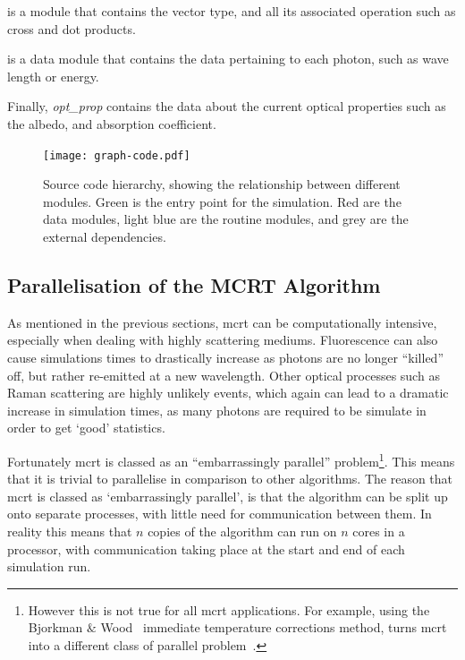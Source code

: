  is a module that contains the vector type, and all its associated operation such as cross and dot products.

 is a data module that contains the data pertaining to each photon, such as wave length or energy.

\noindent Finally, {\color{red} \textit{opt_prop}} contains the data about the current optical properties such as the albedo, and absorption coefficient.


\begin{figure}[!ht]
	\centering
	\texttt{[image: graph-code.pdf]}
	\caption{Source code hierarchy, showing the relationship between different modules. Green is the entry point for the simulation. Red are the data modules, light blue are the routine modules, and grey are the external dependencies.}
	\label{fig:codegraph}
\end{figure}



\subsection*{Parallelisation of the MCRT Algorithm}\label{sec:parasec}

As mentioned in the previous sections, \gls*{mcrt} can be computationally intensive, especially when dealing with highly scattering mediums. Fluorescence can also cause simulations times to drastically increase as photons are no longer ``killed'' off, but rather re-emitted at a new wavelength. Other optical processes such as Raman scattering are highly unlikely events, which again can lead to a dramatic increase in simulation times, as many photons are required to be simulate in order to get `good' statistics.

Fortunately \gls*{mcrt} is classed as an ``embarrassingly parallel'' problem\footnote{However this is not true for all \gls*{mcrt} applications. For example, using the Bjorkman $\&$ Wood~\cite{bjorkman2001radiative} immediate temperature corrections method, turns \gls*{mcrt} into a different class of parallel problem~\cite{robitaille2011hyperion}.}.
This means that it is trivial to parallelise in comparison to other algorithms. 
The reason that \gls*{mcrt} is classed as `embarrassingly parallel', is that the algorithm can be split up onto separate processes, with little need for communication between them. 
In reality this means that $n$ copies of the algorithm can run on $n$ cores in a processor, with communication taking place at the start and end of each simulation run. 

